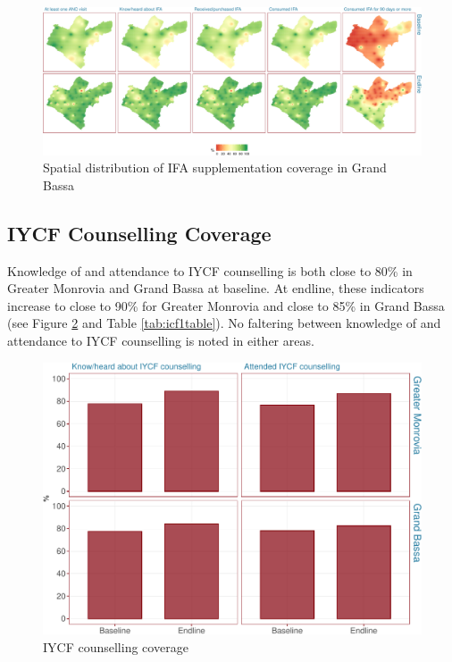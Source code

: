 \documentclass[12pt,a4paper]{article}
\begin{document}
\begin{figure}[H]

{\centering \includegraphics{liberiaCoverageFinalReport_files/figure-latex/ifa2map-1} 

}

\caption{Spatial distribution of IFA supplementation coverage in Grand Bassa}\label{fig:ifa2map}
\end{figure}

\newpage

\hypertarget{iycf-counselling-coverage}{%
\subsection{IYCF Counselling Coverage}\label{iycf-counselling-coverage}}

Knowledge of and attendance to IYCF counselling is both close to 80\% in Greater Monrovia and Grand Bassa at baseline. At endline, these indicators increase to close to 90\% for Greater Monrovia and close to 85\% in Grand Bassa (see Figure \ref{fig:icf1plot} and Table \ref{tab:icf1table}). No faltering between knowledge of and attendance to IYCF counselling is noted in either areas.

\begin{figure}[H]

{\centering \includegraphics{liberiaCoverageFinalReport_files/figure-latex/icf1plot-1} 

}

\caption{IYCF counselling coverage}\label{fig:icf1plot}
\end{figure}
\end{document}
